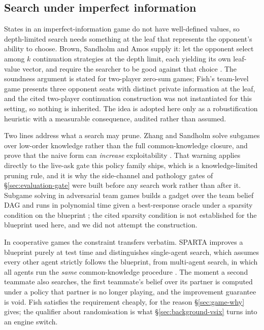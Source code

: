 \subsection{Search under imperfect information}
\label{sec:related-search}

States in an imperfect-information game do not have well-defined values, so depth-limited search
needs something at the leaf that represents the opponent's ability to choose. Brown, Sandholm and
Amos supply it: let the opponent select among $k$ continuation strategies at the depth limit, each
yielding its own leaf-value vector, and require the searcher to be good against that choice
\cite{brown2018depthlimited}. The soundness argument is stated for two-player zero-sum games;
Fish's team-level game presents three opponent seats with distinct private information at the
leaf, and the cited two-player continuation construction was not instantiated for this setting, so
nothing is inherited. The idea is adopted here only as a robustification heuristic with a
measurable consequence, audited rather than assumed.

Two lines address what a search may prune. Zhang and Sandholm solve subgames over low-order
knowledge rather than the full common-knowledge closure, and prove that the naive form can
\emph{increase} exploitability \cite{zhang2021subgamesolvingwithoutck}. That warning applies directly
to the live-ask gate this policy family ships, which is a knowledge-limited pruning rule, and it is
why the side-channel and pathology gates of \S\ref{sec:evaluation-gate} were built before any
search work rather than after it. Subgame solving in adversarial team games builds a gadget over the
team belief DAG and runs in polynomial time given a best-response oracle under a sparsity condition
on the blueprint \cite{zhang2022teamsubgame}; the cited sparsity condition is not established for
the blueprint used here, and we did not attempt the construction.

In cooperative games the constraint transfers verbatim. SPARTA improves a blueprint purely at test
time and distinguishes single-agent search, which assumes every other agent strictly follows the
blueprint, from multi-agent search, in which all agents run the \emph{same} common-knowledge
procedure \cite{lerer2020sparta}. The moment a second teammate also searches, the first teammate's
belief over its partner is computed under a policy that partner is no longer playing, and the
improvement guarantee is void. Fish satisfies the requirement cheaply, for the reason
\S\ref{sec:game-why} gives; the qualifier about randomisation is what
\S\ref{sec:background-vsix} turns into an engine switch.

